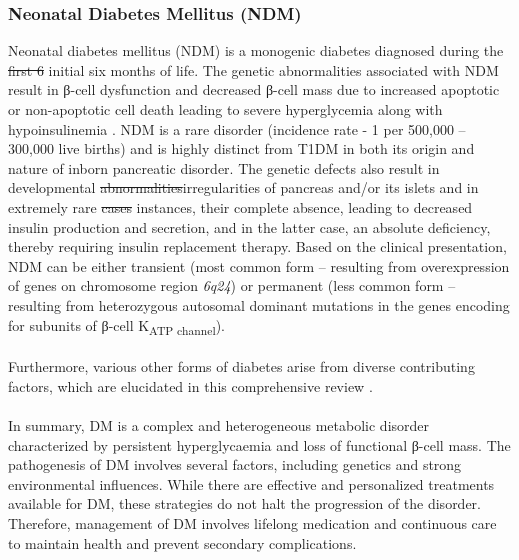 \subsubsection{Neonatal Diabetes Mellitus (NDM)}
Neonatal diabetes mellitus (NDM) is a monogenic diabetes diagnosed during the \st{first 6} initial six months of life. The genetic abnormalities associated with NDM result in β-cell dysfunction and decreased β-cell mass due to increased apoptotic or non-apoptotic cell death leading to severe hyperglycemia along with hypoinsulinemia \textbf{\cite{banday_pathophysiology_2020}}. NDM is a rare disorder (incidence rate - 1 per 500,000 – 300,000 live births) \textbf{\cite{banday_pathophysiology_2020,iafusco_minimal_2012,polak_neonatal_2007}}  and is highly distinct from T1DM in both its origin and nature of inborn pancreatic disorder. The genetic defects also result in developmental \st{abnormalities}irregularities of pancreas and/or its islets and in extremely rare \st{cases} instances, their complete absence, leading to decreased insulin production and secretion, and in the latter case, an absolute deficiency, thereby requiring insulin replacement therapy. Based on the clinical presentation, NDM can be either transient (most common form – resulting from overexpression of genes on chromosome region \textit{6q24}) or permanent (less common form – resulting from heterozygous autosomal dominant mutations in the genes encoding for subunits of β-cell K\textsubscript{ATP channel}).%
\\\\Furthermore, various other forms of diabetes arise from diverse contributing factors, which are elucidated in this comprehensive review \textbf{\cite{banday_pathophysiology_2020}}.
\\\\
In summary, DM is a complex and heterogeneous metabolic disorder characterized by persistent hyperglycaemia and loss of functional β-cell mass. The pathogenesis of DM involves several factors, including genetics and strong environmental influences. While there are effective and personalized treatments available for DM, these strategies do not halt the progression of the disorder. Therefore, management of DM involves lifelong medication and continuous care to maintain health and prevent secondary complications. 

